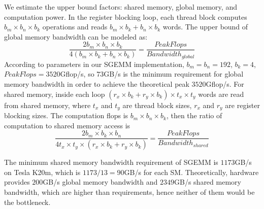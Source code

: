 We estimate the upper bound factors: 
shared memory, global memory, and computation power. In the register blocking loop, each thread block computes $b_m \times b_n \times b_k$ operations and reads $b_m \times b_k+b_n \times b_k$ words. The upper bound of global memory bandwidth can be modeled as:
{\small
\begin{equation}
    \frac{2 b_m \times b_n \times b_k}{4 (b_m \times b_k + b_n \times b_k)} = \frac{PeakFlops}{Bandwidth_{global}}
    \label{equ:global}
\end{equation}
}
According to parameters in our SGEMM implementation, $b_m=b_n=192$, $b_k=4$, $PeakFlops=3520$Gflop/s, so $73$GB/s is the minimum
requirement for global memory bandwidth in order to achieve the theoretical peak $3520$Gflop/s.
For shared memory, inside each loop $(r_x \times b_k + r_y \times b_k) \times t_x \times t_y$ words are read from shared memory, where $t_x$ and
$t_y$ are thread block sizes, $r_x$ and $r_y$ are register blocking sizes. The computation flops is $b_m \times b_n \times b_k$, then the ratio of computation to shared memory access is
{\small
\begin{equation}
    \frac{2 b_m \times b_k \times b_n}{4 t_x \times t_y \times (r_x \times b_k + r_y  \times b_k)}  = \frac{PeakFlops}{Bandwidth_{shared}}
    \label{equ:shared}
\end{equation}
}

The minimum shared memory bandwidth requirement of SGEMM is
$1173$GB/s on Tesla K20m, which is $1173/13=90$GB/s for each SM. 
Theoretically, hardware provides
$200$GB/s global memory bandwidth and $2349$GB/s shared memory bandwidth, which are higher than requirements, hence neither of them would be the bottleneck.

